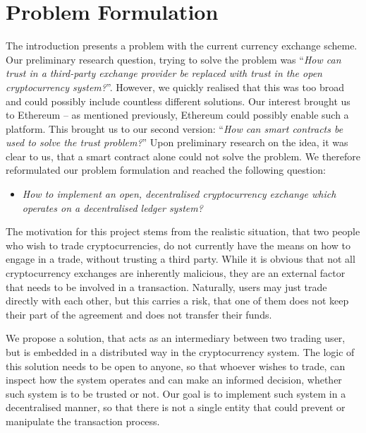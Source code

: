 \section{Problem Formulation}\label{sec:problem-formulation}
% 
The introduction presents a problem with the current currency exchange scheme. Our preliminary research question, trying to solve the problem was ``\textit{How can trust in a third-party exchange provider be replaced with trust in the open cryptocurrency system?}''. However, we quickly realised that this was too broad and could possibly include countless different solutions. Our interest brought us to Ethereum -- as mentioned previously, Ethereum could possibly enable such a platform. This brought us to our second version: ``\textit{How can smart contracts be used to solve the trust problem?}'' Upon preliminary research on the idea, it was clear to us, that a smart contract alone could not solve the problem. We therefore reformulated our problem formulation and reached the following question:

\begin{itemize}
    \item \textit{How to implement an open, decentralised cryptocurrency exchange which operates on a decentralised ledger system?}
\end{itemize}

\noindent The motivation for this project stems from the realistic situation, that two people who wish to trade cryptocurrencies, do not currently have the means on how to engage in a trade, without trusting a third party. While it is obvious that not all cryptocurrency exchanges are inherently malicious, they are an external factor that needs to be involved in a transaction. Naturally, users may just trade directly with each other, but this carries a risk, that one of them does not keep their part of the agreement and does not transfer their funds.

We propose a solution, that acts as an intermediary between two trading user, but is embedded in a distributed way in the cryptocurrency system. The logic of this solution needs to be open to anyone, so that whoever wishes to trade, can inspect how the system operates and can make an informed decision, whether such system is to be trusted or not. Our goal is to implement such system in a decentralised manner, so that there is not a single entity that could prevent or manipulate the transaction process.